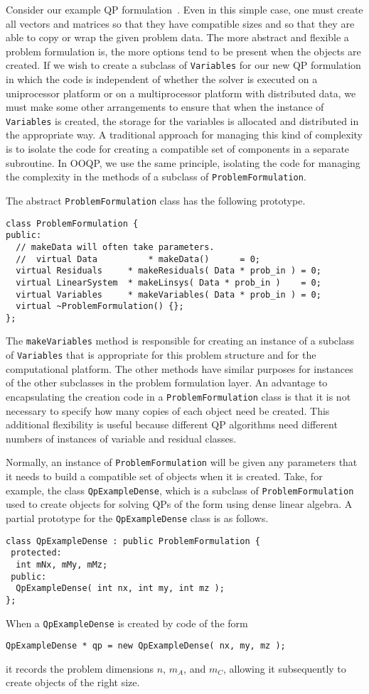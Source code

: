 Consider our example QP formulation~. Even in this simple
case, one must create all vectors and matrices so that they have
compatible sizes and so that they are able to copy or wrap the given
problem data. The more abstract and flexible a problem formulation is,
the more options tend to be present when the objects are created. If
we wish to create a subclass of \texttt{Variables} for our new QP
formulation in which the code is independent of whether the solver is
executed on a uniprocessor platform or on a multiprocessor platform
with distributed data, we must make some other arrangements to ensure
that when the instance of \texttt{Variables} is created, the storage
for the variables is allocated and distributed in the appropriate way.
A traditional approach for managing this kind of complexity is to
isolate the code for creating a compatible set of components in a
separate subroutine. In OOQP, we use the same principle, isolating the
code for managing the complexity in the methods of a subclass of
\texttt{ProblemFormulation}.

The abstract \texttt{ProblemFormulation} class has the following
prototype.
\begin{verbatim}
class ProblemFormulation {
public:
  // makeData will often take parameters.
  //  virtual Data          * makeData()      = 0;
  virtual Residuals     * makeResiduals( Data * prob_in ) = 0;
  virtual LinearSystem  * makeLinsys( Data * prob_in )    = 0;
  virtual Variables     * makeVariables( Data * prob_in ) = 0;
  virtual ~ProblemFormulation() {};
};
\end{verbatim}
The \texttt{makeVariables} method is responsible for creating an
instance of a subclass of \texttt{Variables} that is appropriate for
this problem structure and for the computational platform. The other
methods have similar purposes for instances of the other subclasses in
the problem formulation layer.  An advantage to encapsulating the
creation code in a {\tt ProblemFormulation} class is that it is not
necessary to specify how many copies of each object need be created.
This additional flexibility is useful because different QP algorithms
need different numbers of instances of variable and residual classes.

Normally, an instance of \texttt{ProblemFormulation} will be given any
parameters that it needs to build a compatible set of objects when it
is created. Take, for example, the class \texttt{QpExampleDense},
which is a subclass of \texttt{ProblemFormulation} used to create
objects for solving QPs of the form  using dense linear
algebra. A partial prototype for the \texttt{QpExampleDense} class is
as follows.
\begin{verbatim}
class QpExampleDense : public ProblemFormulation {
 protected:
  int mNx, mMy, mMz;
 public: 
  QpExampleDense( int nx, int my, int mz );
};
\end{verbatim}
When a \texttt{QpExampleDense} is created by code of the form
\begin{verbatim}
QpExampleDense * qp = new QpExampleDense( nx, my, mz );
\end{verbatim}
it records the problem dimensions $n$, $m_A$, and $m_C$, allowing it
subsequently to create objects of the right size.

